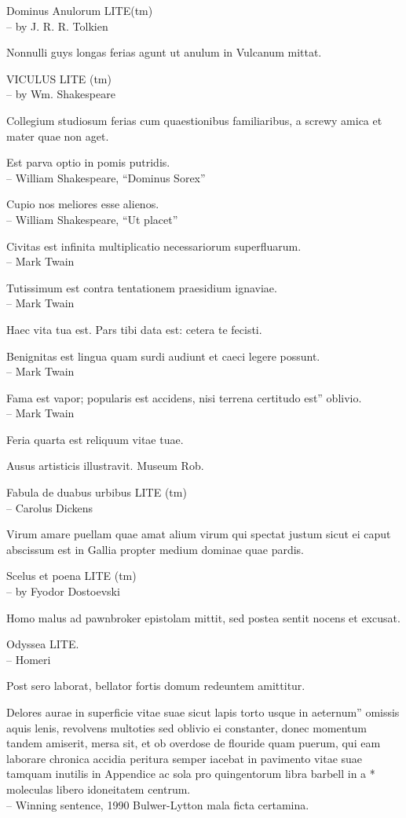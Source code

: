 \documentclass[titlepage,12pt]{memoir}
\begin{document}
Dominus Anulorum LITE(tm)
\\-- by J. R. R. Tolkien

Nonnulli guys longas ferias agunt ut anulum in Vulcanum mittat.

VICULUS LITE (tm)
\\-- by Wm. Shakespeare

Collegium studiosum ferias cum quaestionibus familiaribus, a screwy
amica et mater quae non aget.

Est parva optio in pomis putridis.
\\-- William Shakespeare, “Dominus Sorex”

 Cupio nos meliores esse alienos.
\\-- William Shakespeare, “Ut placet”

Civitas est infinita multiplicatio necessariorum superfluarum.
\\-- Mark Twain

Tutissimum est contra tentationem praesidium ignaviae.
\\-- Mark Twain

Haec vita tua est. Pars tibi data est: cetera te fecisti.

 Benignitas est lingua quam surdi audiunt et caeci legere possunt.
\\-- Mark Twain

Fama est vapor; popularis est accidens, nisi terrena certitudo est”
oblivio.
\\-- Mark Twain

Feria quarta est reliquum vitae tuae.

Ausus artisticis illustravit. Museum Rob.

Fabula de duabus urbibus LITE (tm)
\\-- Carolus Dickens

Virum amare puellam quae amat alium virum qui spectat justum
sicut ei caput abscissum est in Gallia propter medium
dominae quae pardis.

Scelus et poena LITE (tm)
\\-- by Fyodor Dostoevski

Homo malus ad pawnbroker epistolam mittit, sed postea
sentit nocens et excusat.

Odyssea LITE.
\\-- Homeri

Post sero laborat, bellator fortis domum redeuntem amittitur.

Delores aurae in superficie vitae suae sicut lapis torto usque in aeternum”
omissis aquis lenis, revolvens multoties sed oblivio
ei constanter, donec momentum tandem amiserit, mersa sit, et ob
overdose de flouride quam puerum, qui eam laborare chronica
accidia peritura semper iacebat in pavimento vitae suae tamquam inutilis
in Appendice ac sola pro quingentorum libra barbell in a *
moleculas libero idoneitatem centrum.
\\-- Winning sentence, 1990 Bulwer-Lytton mala ficta certamina.
\end{document}
